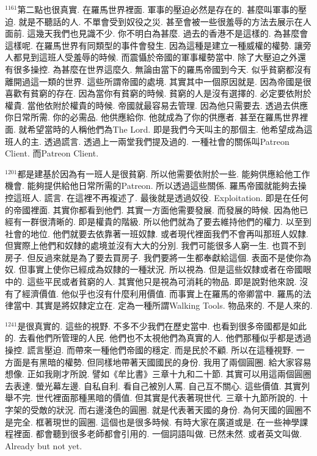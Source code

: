 \documentclass{book}
\begin{document}
$^{1161}$第二點也很真實.
在羅馬世界裡面.
軍事的壓迫必然是存在的.
甚麼叫軍事的壓迫.
就是不聽話的人.
不單會受到奴役之災.
甚至會被一些很羞辱的方法去展示在人面前.
這幾天我們也見識不少.
你不明白為甚麼.
過去的香港不是這樣的.
為甚麼會這樣呢.
在羅馬世界有同類型的事件會發生.
因為這種是建立一種威權的權勢.
讓旁人都見到這班人受羞辱的時候.
而震懾於帝國的軍事權勢當中.
除了大壓迫之外還有很多操控.
為甚麼在世界這麼久.
無論由當下的羅馬帝國到今天.
似乎貧窮都沒有離開過這一類的世界.
這些所謂帝國的處境.
其實其中一個原因就是.
因為帝國是很喜歡有貧窮的存在.
因為當你有貧窮的時候.
貧窮的人是沒有選擇的.
必定要依附於權貴.
當他依附於權貴的時候.
帝國就最容易去管理.
因為他只需要去.
透過去供應你日常所需.
你的必需品.
他供應給你.
他就成為了你的供應者.
甚至在羅馬世界裡面.
就希望當時的人稱他們為The Lord.
即是我們今天叫主的那個主.
他希望成為這班人的主.
透過謊言.
透過上一兩堂我們提及過的.
一種社會的關係叫Patreon Client.
而Patreon Client.

$^{1201}$都是建基於因為有一班人是很貧窮.
所以他需要依附於一些.
能夠供應給他工作機會.
能夠提供給他日常所需的Patreon.
所以透過這些關係.
羅馬帝國就能夠去操控這班人.
謊言.
在這裡不再複述了.
最後就是透過奴役.
Exploitation.
即是在任何的帝國裡面.
其實你都看到他們.
其實一方面他需要發展.
而發展的時候.
因為他已經有一群很清晰的.
即是權貴的階級.
所以他們就為了要去維持他們的權力.
以至到社會的地位.
他們就要去依靠著一班奴隸.
或者現代裡面我們不會再叫那班人奴隸.
但實際上他們和奴隸的處境並沒有大大的分別.
我們可能很多人窮一生.
也買不到房子.
但反過來就是為了要去買房子.
我們要將一生都奉獻給這個.
表面不是使你為奴.
但事實上使你已經成為奴隸的一種狀況.
所以視為.
但是這些奴隸或者在帝國眼中的.
這些平民或者貧窮的人.
其實他只是視為可消耗的物品.
即是說對他來說.
沒有了經濟價值.
他似乎也沒有什麼利用價值.
而事實上在羅馬的帝卿當中.
羅馬的法律當中.
其實是將奴隸定立在.
定為一種所謂Walking Tools.
物品來的.
不是人來的.

$^{1241}$是很真實的.
這些的視野.
不多不少我們在歷史當中.
也看到很多帝國都是如此的.
去看他們所管理的人民.
他們也不太視他們為真實的人.
他們那種似乎都是透過操控.
謊言壓迫.
而帶來一種他們帝國的穩定.
而是民於不顧.
所以在這種視野.
一方面是有黑暗的權勢.
但同樣地帶著天國國民的身份.
我用了兩個圓圈.
給大家容易想像.
正如我剛才所說.
譬如《牟比書》三章十九和二十節.
其實可以用這兩個圓圈去表達.
螢光幕左邊.
自私自利.
看自己被別人罵.
自己互不關心.
這些價值.
其實列舉不完.
世代裡面那種黑暗的價值.
但其實是代表著現世代.
三章十九節所說的.
十字架的受敵的狀況.
而右邊淺色的圓圈.
就是代表著天國的身份.
為何天國的圓圈不是完全.
框著現世的圓圈.
這個也是很多時候.
有時大家在廣道或是.
在一些神學課程裡面.
都會聽到很多老師都會引用的.
一個詞語叫做.
已然未然.
或者英文叫做.
Already but not yet.
\end{document}
